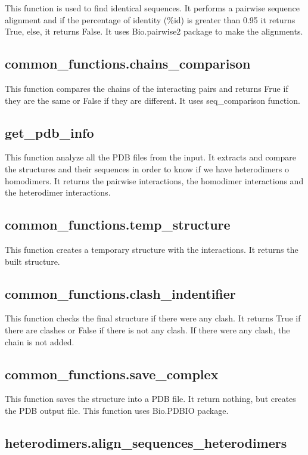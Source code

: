 \documentclass[a4paper,10pt]{report}
\begin{document}
This function is used to find identical sequences. It performs a pairwise sequence alignment and if the percentage of identity (\%id) is greater than 0.95 it returns True, else, it returns False. It uses Bio.pairwise2 package to make the alignments.

\subsection{common\_functions.chains\_comparison}

This function compares the chains of the interacting pairs and returns Frue if they are the same or False if they are different. It uses seq\_comparison function.

\subsection{get\_pdb\_info}

This function analyze all the PDB files from the input. It extracts and compare the structures and their sequences in order to know if we have heterodimers o homodimers. It returns the pairwise interactions, the homodimer interactions and the heterodimer interactions.

\subsection{common\_functions.temp\_structure}

This function creates a temporary structure with the interactions. It returns the built structure.

\subsection{common\_functions.clash\_indentifier}

This function checks the final structure if there were any clash. It returns True if there are clashes or False if there is not any clash. If there were any clash, the chain is not added.

\subsection{common\_functions.save\_complex}

This function saves the structure into a PDB file. It return nothing, but creates the PDB output file. This function uses Bio.PDBIO package.

\subsection{heterodimers.align\_sequences\_heterodimers}
\end{document}
